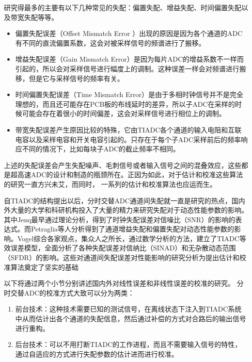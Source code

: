 	研究得最多的主要有以下几种常见的失配：偏置失配、增益失配、时间偏置失配以及带宽失配等等。
	\begin{itemize}
		\item 偏置失配误差（Offset Mismatch Error ）出现的原因是因为各个通道的ADC有不同的直流偏置系数，这会对被采样信号的频谱进行了搬移。
		\item 增益失配误差（Gain Mismatch Error）是因为每片ADC的增益系数不一样而引起的，所以会对采样信号进行幅度上的调制。这种误差一样会对频谱进行搬移，但是它与采样信号的频率有关。
		\item 时间偏置失配误差（Time Mismatch Error）是由于多相时钟信号并不是完全理想的，而且还可能存在PCB板的布线延时的差异，所以子ADC在采样的时候可能会存在着很小的时间偏差，这会对采样信号进行相位上的调制。		
		\item 带宽失配误差产生原因比较的特殊，它由TIADC各个通道的输入电阻和互联电容以及采样电容和开关电容引起的。只存在于每个子ADC采样前后的频率响应不同的情况下，比如每块子ADC的截止频率不相同。
		
	\end{itemize}
	
	上述的失配误差会产生失配噪声、毛刺信号或者输入信号之间的混叠效应，这些都是超高速ADC的设计和制造的瓶颈所在。正因为如此，对于估计和校准这些算法的研究一直方兴未艾，而同时， 一系列的估计和校准算法也应运而生。
	\par
	自TIADC的结构提出以后，分时交替ADC通道间失配就一直是研究的热点，国内外大量的大学和科研机构投入了大量的精力来研究失配对于动态性能参数的影响。其中Jenq最早通过理论分析，得到了时钟失配误差对信噪比（SNR）的影响的表达式\cite{jenq1988digital}。而Petraglia等人\cite {petraglia1991analysis}分析得到了通道增益失配和偏置失配对动态性能参数的影响。Vogel\cite {vogel2005impact}综合各家观点，集众人之所长，通过数学分析的方法，建立了TIADC等效误差模型，全面分析了各种失配误差对信纳比（SINAD）和无杂散动态范围（SFDR）的影响。这些对通道间失配误差对性能影响的研究分析为提出估计和校准算法奠定了坚实的基础\par
	以下将通过两个小节分别讲述国内外对线性误差和非线性误差的校准的研究。
	分时交替ADC的校准方式大致可以分为两类：
	\begin {enumerate}
		\item 前台技术：这种技术需要已知的测试信号，在离线状态下注入到TIADC系统中从而估计出各个通道的失配信息，然后通过补偿的方式对合路后的输出信号进行重构。		\item 后台技术：可以不用打断TIADC的工作进程，而且不需要输入信号的特性，通过自适应的方式进行失配参数的估计进而进行校准。
	\end {enumerate}
	
